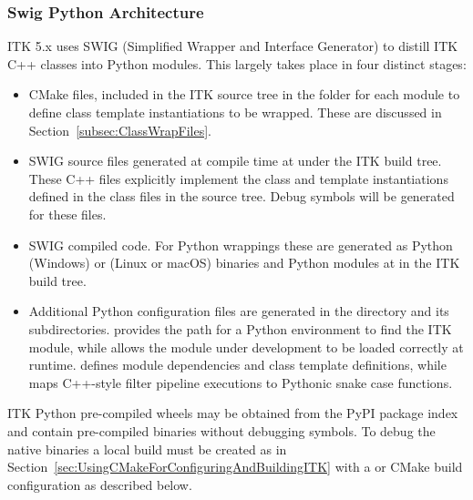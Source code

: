 \subsubsection{Swig Python Architecture}
\label{subsubsec:SwigArchitecture}

ITK 5.x uses SWIG (Simplified Wrapper and Interface Generator) to distill ITK C++
classes into Python modules. This largely takes place in four distinct stages:

\begin{itemize}

\item {} CMake files, included in the ITK source tree in the 
folder for each module to define class template instantiations to be wrapped.
These are discussed in Section~\ref{subsec:ClassWrapFiles}.

\item SWIG  source files generated at compile time at 
under the ITK build tree. These C++ files explicitly implement the class and template
instantiations defined in the class  files in the source tree.
Debug symbols will be generated for these files.

\item SWIG compiled code. For Python wrappings these are generated as Python
 (Windows) or  (Linux or macOS) binaries and Python  modules at
 in the ITK build tree.

\item Additional Python configuration files are generated in the
 directory and its subdirectories.
 provides the path for a Python environment to find the ITK
module, while  allows the module under development to be loaded correctly at
runtime.  defines module dependencies and class
template definitions, while  maps
C++-style filter pipeline executions to Pythonic snake case functions.

\end{itemize}

ITK Python pre-compiled wheels may be obtained from the PyPI package index and contain
pre-compiled binaries without debugging symbols. To debug the native binaries a local build
must be created as in Section~\ref{sec:UsingCMakeForConfiguringAndBuildingITK} with a
 or  CMake build configuration as described below.

